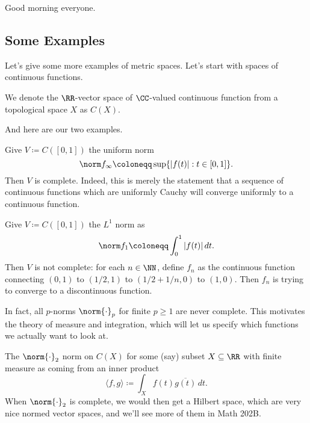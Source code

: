 \documentclass[../notes.tex]{subfiles}
\begin{document}
Good morning everyone.

\subsection{Some Examples}
Let's give some more examples of metric spaces. Let's start with spaces of continuous functions.
\begin{definition}
	We denote the $\RR$-vector space of $\CC$-valued continuous function from a topological space $X$ as $C(X)$.
\end{definition}
And here are our two examples.
\begin{ex}
	Give $V\coloneqq C([0,1])$ the uniform norm
	\[\norm f_\infty\coloneqq\sup\{|f(t)|:t\in[0,1]\}.\]
	Then $V$ is complete. Indeed, this is merely the statement that a sequence of continuous functions which are uniformly Cauchy will converge uniformly to a continuous function.
\end{ex}
\begin{example}
	Give $V\coloneqq C([0,1])$ the $L^1$ norm as
	\[\norm f_1\coloneqq\int_0^1|f(t)|\,dt.\]
	Then $V$ is not complete: for each $n\in\NN$, define $f_n$ as the continuous function connecting $(0,1)$ to $(1/2,1)$ to $(1/2+1/n,0)$ to $(1,0)$. Then $f_n$ is trying to converge to a discontinuous function.%
\end{example}
\begin{remark}
	In fact, all $p$-norms $\norm{\cdot}_p$ for finite $p\ge1$ are never complete. This motivates the theory of measure and integration, which will let us specify which functions we actually want to look at.
\end{remark}
\begin{remark}
	The $\norm{\cdot}_2$ norm on $C(X)$ for some (say) subset $X\subseteq\RR$ with finite measure as coming from an inner product
	\[\langle f,g\rangle\coloneqq\int_Xf(t)\overline{g(t)}\,dt.\]
	When $\norm{\cdot}_2$ is complete, we would then get a Hilbert space, which are very nice normed vector spaces, and we'll see more of them in Math 202B.
\end{remark}
\end{document}
